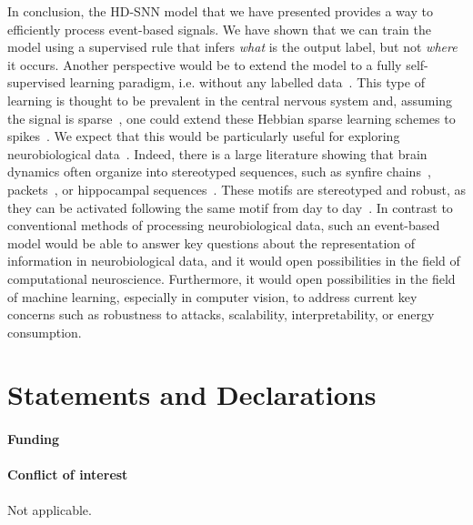 \documentclass[default]{sn-jnl}%
\theoremstyle{thmstyleone}%
\theoremstyle{thmstyletwo}%
\theoremstyle{thmstylethree}%
\begin{document}
In conclusion, the HD-SNN model that we have presented provides a way to efficiently process event-based signals. We have shown that we can train the model using a supervised rule that infers \emph{what} is the output label, but not \emph{where} it occurs. Another perspective would be to extend the model to a fully self-supervised learning paradigm, i.e. without any labelled data~\citep{barlow_unsupervised_1989}. This type of learning is thought to be prevalent in the central nervous system and, assuming the signal is sparse~\citep{olshausen_emergence_1996}, one could extend these Hebbian sparse learning schemes to spikes~\citep{perrinet_emergence_2004, masquelier_competitive_2009}. We expect that this would be particularly useful for exploring neurobiological data~\citep{Perrinet23ICANN}. Indeed, there is a large literature showing that brain dynamics often organize into stereotyped sequences, such as synfire chains~\citep{ikegaya_synfire_2004}, packets~\citep{luczak_sequential_2007}, or hippocampal sequences~\citep{pastalkova_internally_2008, villette_internally_2015}. These motifs are stereotyped and robust, as they can be activated following the same motif from day to day~\citep{haimerl_internal_2019}. In contrast to conventional methods of processing neurobiological data, such an event-based model would be able to answer key questions about the representation of information in neurobiological data, and it would open possibilities in the field of computational neuroscience. Furthermore, it would open possibilities in the field of machine learning, especially in computer vision, to address current key concerns such as robustness to attacks, scalability, interpretability, or energy consumption.
%
\backmatter
%
%
\Acknowledgments
%

\section*{Statements and Declarations}

\paragraph{Funding}

\Funding %

\paragraph{Conflict of interest}
Not applicable.
\end{document}
